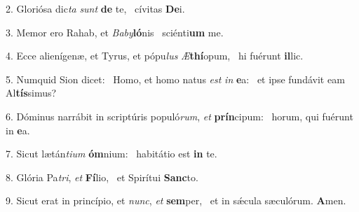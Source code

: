 2. Gloriósa dic\textit{ta} \textit{sunt} \textbf{de} te, \ast\  cívitas \textbf{De}i.\

3. Memor ero Rahab, et \textit{Ba}\textit{by}\textbf{ló}nis \ast\  sciénti\textbf{um} me.\

4. Ecce alienígenæ, et Tyrus, et pópu\textit{lus} \textit{Æ}\textbf{thí}opum, \ast\  hi fuérunt \textbf{il}lic.\

5. Numquid Sion dicet: \dag\  Homo, et homo natus \textit{est} \textit{in} \textbf{e}a: \ast\  et ipse fundávit eam Al\textbf{tís}simus?\

6. Dóminus narrábit in scriptúris populó\textit{rum}, \textit{et} \textbf{prín}cipum: \ast\  horum, qui fuérunt in \textbf{e}a.\

7. Sicut lætán\textit{ti}\textit{um} \textbf{óm}nium: \ast\  habitátio est \textbf{in} te.\

8. Glória Pa\textit{tri}, \textit{et} \textbf{Fí}lio, \ast\  et Spirítui \textbf{Sanc}to.\

9. Sicut erat in princípio, et \textit{nunc}, \textit{et} \textbf{sem}per, \ast\  et in sǽcula sæculórum. \textbf{A}men.\

